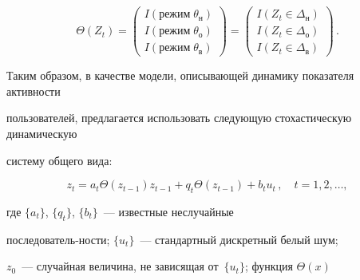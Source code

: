       \begin{equation*}


      \Theta(Z_t)=


      \begin{pmatrix}


      I(\mbox{режим}\; \theta_{\mathrm{н}})\\


      I(\mbox{режим}\; \theta_{\mathrm{о}})\\


      I(\mbox{режим}\; \theta_{\mathrm{в}})


      \end{pmatrix}=


      \begin{pmatrix}


      I(Z_t\in \Delta_{\mathrm{н}})\\


      I(Z_t\in \Delta_{\mathrm{о}})\\


      I(Z_t\in \Delta_{\mathrm{в}})


      \end{pmatrix}


      \,.




      \end{equation*}


      


      


      Таким образом, в качестве модели, описывающей динамику показателя активности 


пользователей, предлагается использовать следующую стохастическую динамическую 


систему общего вида:


\begin{equation}


z_t =a_t\Theta (z_{t-1}) z_{t-1}+q_t\Theta(z_{t-1})+b_tu_t\,,\quad t=1,2,\ldots ,


\label{e10-8}


\end{equation}


где $\{a_t\}$, $\{q_t\}$, $\{b_t\}$~--- известные неслучайные 


последователь-\linebreak ности; $\{u_t\}$~--- стандартный дискретный белый шум; 


$z_0$~--- случайная величина, не зависящая от~$\{u_t\}$; функция $\Theta(x)$ 


